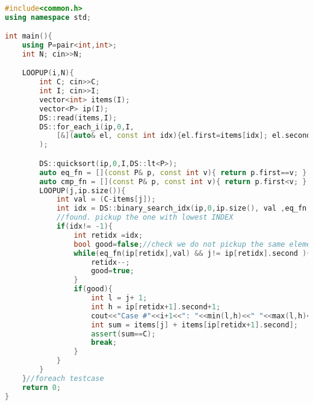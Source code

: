 \begin{solution}
	
	\begin{lstlisting}[language=c++, caption="Store credit c++ solution"]

#include<common.h>
using namespace std;

int main(){
    using P=pair<int,int>;
    int N; cin>>N;

    LOOPUP(i,N){
        int C; cin>>C;
        int I; cin>>I;
        vector<int> items(I);
        vector<P> ip(I);
        DS::read(items,I);
        DS::for_each_i(ip,0,I,
            [&](auto& el, const int idx){el.first=items[idx]; el.second=idx;}
        );

        DS::quicksort(ip,0,I,DS::lt<P>);
        auto eq_fn = [](const P& p, const int v){ return p.first==v; };
        auto cmp_fn = [](const P& p, const int v){ return p.first<v; };
        LOOPUP(j,ip.size()){
            int val = (C-items[j]);
            int idx = DS::binary_search_idx(ip,0,ip.size(), val ,eq_fn,cmp_fn);
            //found. pickup the one with lowest INDEX
            if(idx!= -1){
                int retidx =idx;
                bool good=false;//check we do not pickup the same element twice
                while(eq_fn(ip[retidx],val) && j!= ip[retidx].second ){
                    retidx--;
                    good=true;
                }
                if(good){
                    int l = j+ 1;
                    int h = ip[retidx+1].second+1;
                    cout<<"Case #"<<i+1<<": "<<min(l,h)<<" "<<max(l,h)<<endl;
                    int sum = items[j] + items[ip[retidx+1].second];
                    assert(sum==C);
                    break;
                }
            }
        }
    }//foreach testcase
    return 0;
}

	\end{lstlisting}
\end{solution}





